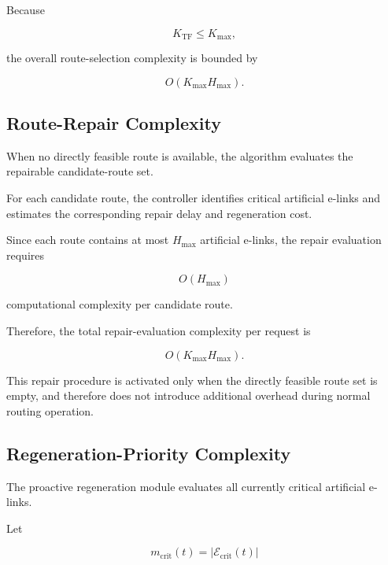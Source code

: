 Because

\begin{equation}
    K_{\mathrm{TF}}
    \leq
    K_{\max},
\end{equation}

the overall route-selection complexity is bounded by

\begin{equation}
    O
    \left(
    K_{\max}H_{\max}
    \right).
\end{equation}


\subsection{Route-Repair Complexity}

When no directly feasible route is available, the algorithm evaluates the repairable candidate-route set.

For each candidate route, the controller identifies critical artificial e-links and estimates the corresponding repair delay and regeneration cost.

Since each route contains at most $H_{\max}$ artificial e-links, the repair evaluation requires

\begin{equation}
    O
    \left(
    H_{\max}
    \right)
\end{equation}

computational complexity per candidate route.

Therefore, the total repair-evaluation complexity per request is

\begin{equation}
    O
    \left(
    K_{\max}H_{\max}
    \right).
\end{equation}

This repair procedure is activated only when the directly feasible route set is empty, and therefore does not introduce additional overhead during normal routing operation.


\subsection{Regeneration-Priority Complexity}

The proactive regeneration module evaluates all currently critical artificial e-links.

Let

\begin{equation}
    m_{\mathrm{crit}}(t)
    =
    |\mathcal{E}_{\mathrm{crit}}(t)|
\end{equation}

